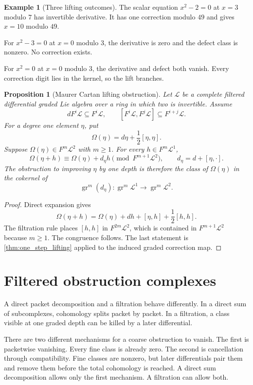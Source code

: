 \documentclass[11pt,a4paper]{article}
\theoremstyle{plain}
\newtheorem{proposition}[proposition]{Proposition}
\theoremstyle{definition}
\newtheorem{example}[example]{Example}
\theoremstyle{remark}
\newcommand{\Lcal}{\mathcal L}
\newcommand{\gr}{\operatorname{gr}}
\begin{document}
\begin{example}[Three lifting outcomes]\label{ex:three_lifting_outcomes}
The scalar equation $x^2-2=0$ at $x=3$ modulo $7$ has invertible derivative.  It has one correction modulo $49$ and gives $x=10$ modulo $49$.

For $x^2-3=0$ at $x=0$ modulo $3$, the derivative is zero and the defect class is nonzero.  No correction exists.

For $x^2=0$ at $x=0$ modulo $3$, the derivative and defect both vanish.  Every correction digit lies in the kernel, so the lift branches.
\end{example}

\begin{proposition}[Maurer Cartan lifting obstruction]\label{prop:maurer_cartan_lifting}
Let $\Lcal$ be a complete filtered differential graded Lie algebra over a ring in which two is invertible.  Assume
\[
dF^i\Lcal\subseteq F^i\Lcal,
\qquad
[F^i\Lcal,F^j\Lcal]\subseteq F^{i+j}\Lcal.
\]
For a degree one element $\eta$, put
\[
\Omega(\eta)=d\eta+\frac12[\eta,\eta].
\]
Suppose $\Omega(\eta)\in F^m\Lcal^2$ with $m\ge1$.  For every $h\in F^m\Lcal^1$,
\[
\Omega(\eta+h)
\equiv
\Omega(\eta)+d_\eta h
\pmod{F^{m+1}\Lcal^2},
\qquad
d_\eta=d+[\eta,\mathord\cdot].
\]
The obstruction to improving $\eta$ by one depth is therefore the class of $\Omega(\eta)$ in the cokernel of
\[
\gr^m(d_\eta):
\gr^m\Lcal^1
\longrightarrow
\gr^m\Lcal^2.
\]
\end{proposition}

\begin{proof}
Direct expansion gives
\[
\Omega(\eta+h)
=
\Omega(\eta)+dh+[\eta,h]+\frac12[h,h].
\]
The filtration rule places $[h,h]$ in $F^{2m}\Lcal^2$, which is contained in $F^{m+1}\Lcal^2$ because $m\ge1$.  The congruence follows.  The last statement is \cref{thm:one_step_lifting} applied to the induced graded correction map.
\end{proof}

\section{Filtered obstruction complexes}\label{sec:obstruction_spectral_sequence}

A direct packet decomposition and a filtration behave differently.  In a direct sum of subcomplexes, cohomology splits packet by packet.  In a filtration, a class visible at one graded depth can be killed by a later differential.


There are two different mechanisms for a coarse obstruction to vanish.  The first is packetwise vanishing.  Every fine class is already zero.  The second is cancellation through compatibility.  Fine classes are nonzero, but later differentials pair them and remove them before the total cohomology is reached.  A direct sum decomposition allows only the first mechanism.  A filtration can allow both.
\end{document}
